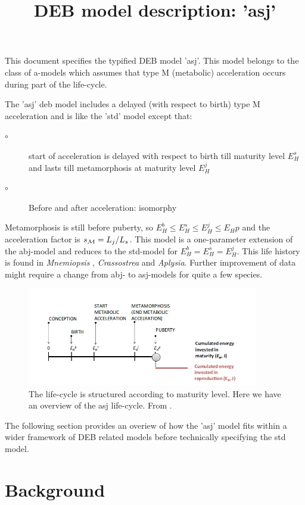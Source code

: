 \documentclass{article}
\title{DEB model description: 'asj'}
\begin{document}
\maketitle

This document specifies the typified DEB model 'asj'.
This model belongs to the class of a-models which assumes that type {\cal M} (metabolic) acceleration occurs during part of the life-cycle. 


The 'asj' {\sc deb} model includes a delayed (with respect to birth) type {\cal M} acceleration and is like the 'std' model except that:
\begin{description}
  \item[$\circ$] start of acceleration is delayed with respect to birth till maturity level $E_H^s$ and lasts till metamorphosis at maturity level $E_H^j$
	
  \item[$\circ$] Before and after acceleration: isomorphy
\end{description}
Metamorphosis is still before puberty, so $E_H^b \le E_H^s \le E_H^j \le E_Hp$ and the acceleration factor is $s_{\cal M} = L_j/ L_s$.
This model is a one-parameter extension of the abj-model and reduces to the std-model for $E_H^b = E_H^s = E_H^j$.
This life history is found in \emph{Mnemiopsis} \citep{AuguJasp2014}, \emph{Crassostrea} and \emph{Aplysia}.
Further improvement of data might require a change from abj- to asj-models for quite a few species.


\begin{figure}[htbp]%
\includegraphics[width=0.9\textwidth]{asj.jpg}%
\caption{\protect\small The life-cycle is structured according to maturity level. Here we have an overview of the asj life-cycle. From \citet{AuguJasp2014}.}%
\label{fig:asj}%
\end{figure}

The following section provides an overiew of how the 'asj' model fits within a wider framework of DEB related models before technically specifying the std model.

\section{Background}







\end{document}
